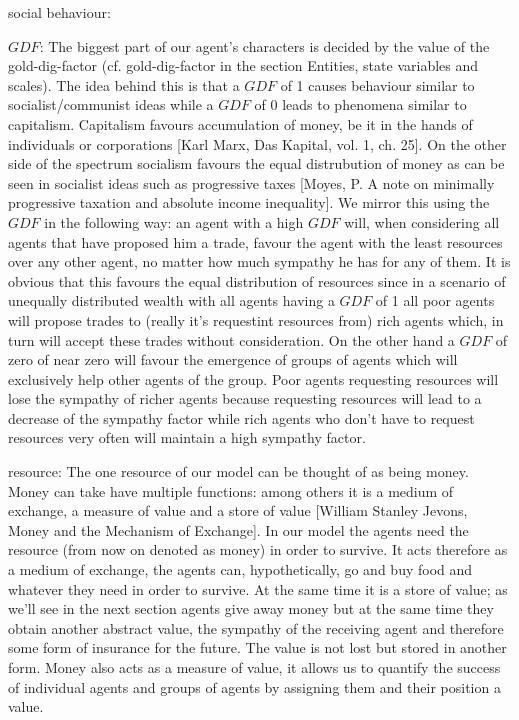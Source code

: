 \documentclass{JASSS}
\newcommand{\gdf}{\mathit{GDF}}
\begin{document}
	social behaviour:
	\begin{description*}
		\item[$\gdf$:]
			The biggest part of our agent's characters is decided by the value of the gold-dig-factor (cf. gold-dig-factor in the section Entities, state variables and scales). The idea behind this is that a $\gdf$ of 1 causes behaviour similar to socialist/communist ideas while a $\gdf$ of 0 leads to phenomena similar to capitalism. Capitalism favours accumulation of money, be it in the hands of individuals or corporations [Karl Marx, Das Kapital, vol. 1, ch. 25]. On the other side of the spectrum socialism favours the equal distrubution of money as can be seen in socialist ideas such as progressive taxes [Moyes, P. A note on minimally progressive taxation and absolute income inequality]. We mirror this using the $\gdf$ in the following way: an agent with a high $\gdf$ will, when considering all agents that have proposed him a trade, favour the agent with the least resources over any other agent, no matter how much sympathy he has for any of them. It is obvious that this favours the equal distribution of resources since in a scenario of unequally distributed wealth with all agents having a $\gdf$ of 1 all poor agents will propose trades to (really it's requestint resources from) rich agents which, in turn will accept these trades without consideration. On the other hand a $\gdf$ of zero of near zero will favour the emergence of groups of agents which will exclusively help other agents of the group. Poor agents requesting resources will lose the sympathy of richer agents because requesting resources will lead to a decrease of the sympathy factor while rich agents who don't have to request resources very often will maintain a high sympathy factor.
			
		\item[resource:]
			The one resource of our model can be thought of as being money. Money can take have multiple functions: among others it is a medium of exchange, a measure of value and a store of value [William Stanley Jevons, Money and the Mechanism of Exchange]. In our model the agents need the resource (from now on denoted as money) in order to survive. It acts therefore as a medium of exchange, the agents can, hypothetically, go and buy food and whatever they need in order to survive. At the same time it is a store of value; as we'll see in the next section agents give away money but at the same time they obtain another abstract value, the sympathy of the receiving agent and therefore some form of insurance for the future. The value is not lost but stored in another form. Money also acts as a measure of value, it allows us to quantify the success of individual agents and groups of agents by assigning them and their position a value.
			

\end{description*}
\end{document}
